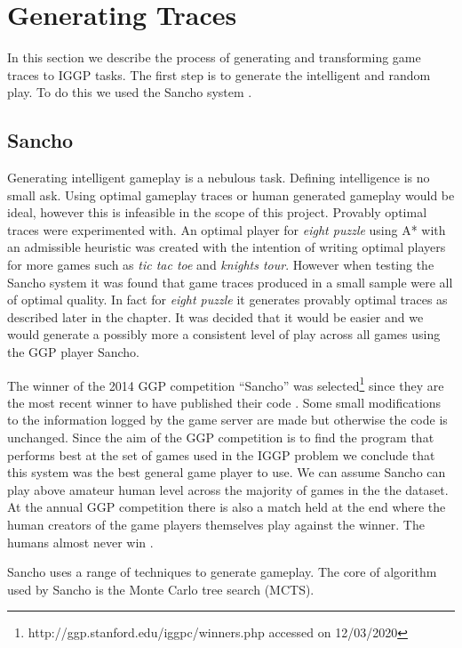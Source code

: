 \chapter{Generating Traces}\label{ch:traces}
In this section we describe the process of generating and transforming game traces to IGGP tasks. The first step is to generate the intelligent and random play. To do this we used the Sancho system \cite{Sancho/Github}.

\section{Sancho}\label{sec:sancho}
Generating intelligent gameplay is a nebulous task. Defining intelligence is no small ask. Using optimal gameplay traces or human generated gameplay would be ideal, however this is infeasible in the scope of this project. Provably optimal traces were experimented with. An optimal player for \textit{eight puzzle} using A* with an admissible heuristic was created with the intention of writing optimal players for more games such as \textit{tic tac toe} and \textit{knights tour}. However when testing the Sancho system it was found that game traces produced in a small sample were all of optimal quality. In fact for \textit{eight puzzle} it generates provably optimal traces as described later in the chapter. It was decided that it would be easier and we would generate a possibly more a consistent level of play across all games using the GGP player Sancho.

The winner of the 2014 GGP competition ``Sancho'' was selected\footnote{http://ggp.stanford.edu/iggpc/winners.php accessed on 12/03/2020} since they are the most recent winner to have published their code \cite{Sancho/Github}. Some small modifications to the information logged by the game server are made but otherwise the code is unchanged. Since the aim of the GGP competition is to find the program that performs best at the set of games used in the IGGP problem we conclude that this system was the best general game player to use. We can assume Sancho can play above amateur human level across the majority of games in the the dataset. At the annual GGP competition there is also a match held at the end where the human creators of the game players themselves play against the winner. The humans almost never win \cite{Genesereth/GGPOverview}.

Sancho uses a range of techniques to generate gameplay. The core of algorithm used by Sancho is the Monte Carlo tree search (MCTS).

